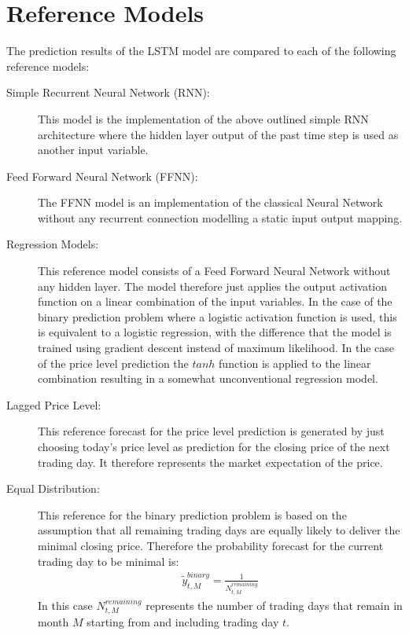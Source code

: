 \section{Reference Models}
The prediction results of the LSTM model are compared to each of the following reference models:
\begin{description}
\item[Simple Recurrent Neural Network (RNN):] This model is the implementation of the above outlined simple RNN architecture where the hidden layer output of the past time step is used as another input variable.
\item[Feed Forward Neural Network (FFNN):] The FFNN model is an implementation of the classical Neural Network without any recurrent connection modelling  a static input output mapping. 
\item[Regression Models:] This reference model consists of a Feed Forward Neural Network without any hidden layer. The model therefore just applies the output activation function on a linear combination of the input variables. In the case of the binary prediction problem  where a logistic activation function is used, this is equivalent to a logistic regression, with the difference that the model is trained using gradient descent instead of maximum likelihood. In the case of the price level prediction the $tanh$ function is applied to the linear combination resulting in a somewhat unconventional regression model.
\item[Lagged Price Level:] This reference forecast for the price level prediction is generated by just choosing today's price level as prediction for the closing price of the next trading day. It therefore represents the market expectation of the price.
\item[Equal Distribution:] This reference for the binary prediction problem is based on the assumption that all remaining trading days are equally likely to deliver the minimal closing price. Therefore the probability forecast for the current trading day to be minimal is: \begin{align*}
\tilde{y}^{binary}_{t,M} = \frac{1}{N^{remaining}_{t,M}}
\end{align*}
In this case $N^{remaining}_{t,M}$ represents the number of trading days that remain in month $M$ starting from and including trading day $t$.
\end{description}


